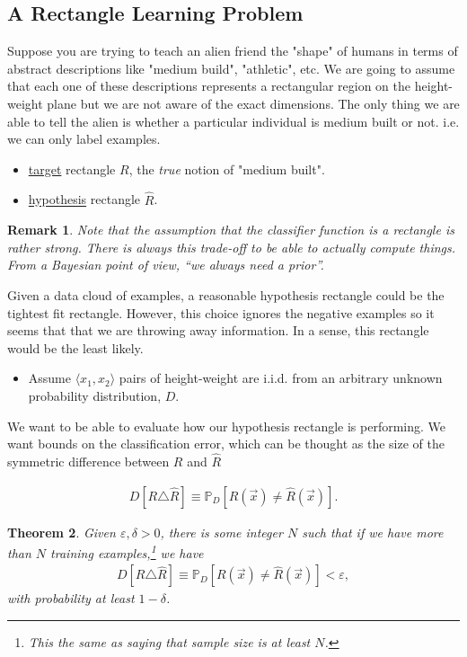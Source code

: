 \documentclass[12pt, letterpaper]{article}
\newcommand{\ul}{\underline}
\newcommand{\mb}{\mathbb}
\newcommand{\ve}{\varepsilon}
\newtheorem{theorem}{Theorem}[section]
\newtheorem{remark}[theorem]{Remark}
\theoremstyle{definition}
\theoremstyle{remark}
\begin{document}
\subsection{A Rectangle Learning Problem}

Suppose you are trying to teach an alien friend the "shape" of humans in terms 
of abstract descriptions like "medium build", "athletic", etc. 
We are going to assume that each one of these descriptions represents a 
rectangular region on the height-weight plane but we are not aware of the exact 
dimensions. The only thing we are able to tell the alien is whether a 
particular individual is medium built or not. i.e. we can only label examples.

\begin{itemize}
	\item \ul{target} rectangle $R$, the \emph{true} notion of "medium built".
	\item \ul{hypothesis} rectangle $\hat R$. 
\end{itemize}

\begin{remark}
	Note that the assumption that the classifier function is a rectangle is 
	rather strong. There is always this trade-off to be able to actually compute things. From a Bayesian point of view, ``we always need a prior''.
\end{remark}

Given a data cloud of examples, a reasonable hypothesis rectangle could be the 
tightest fit rectangle. However, this choice ignores the negative examples so 
it seems that that we are throwing away information. In a sense, this rectangle 
would be the least likely.

\begin{itemize}
	\item Assume $\langle x_1,x_2 \rangle$ pairs of height-weight are i.i.d. from an arbitrary unknown probability distribution, $D$.
\end{itemize}

We want to be able to evaluate how our hypothesis rectangle is performing. We want bounds on the classification error, which can be thought as the size of the symmetric difference between $R$ and $\hat R$

\begin{align*}
	D[R\triangle \hat R] \equiv \mb P_D[R(\vec x) \ne \hat R(\vec x)].
\end{align*}

\begin{theorem}
	Given $\ve,\delta >0$, there is some integer $N$ such that if we have more than $N$ training examples,\footnote{This the same as saying that sample size is at least $N$.} we have
	\begin{align*}
		D[R\triangle \hat R] \equiv \mb P_D[R(\vec x) \ne \hat R(\vec x)] < \ve,
	\end{align*}
	with probability at least $1-\delta$.
\end{theorem}
\end{document}
